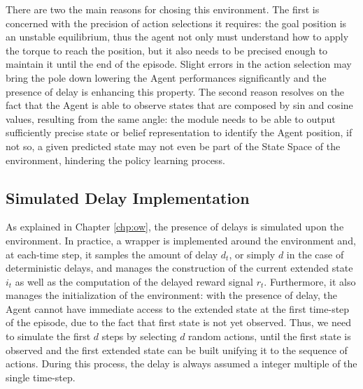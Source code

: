            There are two the main reasons for chosing this environment. The first is concerned with the precision of action selections it requires: the goal position is an unstable equilibrium, thus the agent not only must understand how to apply the torque to reach the position, but it also needs to be precised enough to maintain it until the end of the episode. Slight errors in the action selection may bring the pole down lowering the Agent performances significantly and the presence of delay is enhancing this property. The second reason resolves on the fact that the Agent is able to observe states that are composed by sin and cosine values, resulting from the same angle: the module needs to be able to output sufficiently precise state or belief representation to identify the Agent position, if not so, a given predicted state may not even be part of the State Space of the environment, hindering the policy learning process.
            
        \subsection{Simulated Delay Implementation}
        \label{sub:simulated_delays}
            As explained in Chapter \ref{chp:ow}, the presence of delays is simulated upon the environment. In practice, a wrapper is implemented around the environment and, at each-time step, it samples the amount of delay $d_t$, or simply $d$ in the case of deterministic delays, and manages the construction of the current extended state $i_t$ as well as the computation of the delayed reward signal $r_t$. Furthermore, it also manages the initialization of the environment: with the presence of delay, the Agent cannot have immediate access to the extended state at the first time-step of the episode, due to the fact that first state is not yet observed. Thus, we need to simulate the first $d$ steps by selecting $d$ random actions, until the first state is observed and the first extended state can be built unifying it to the sequence of actions. During this process, the delay is always assumed a integer multiple of the single time-step.
            
